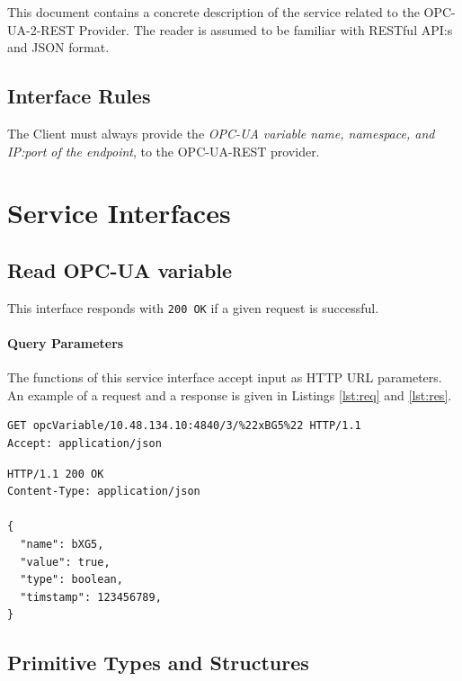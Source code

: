 \documentclass[a4paper]{arrowhead}
\begin{document}
This document contains a concrete description of the service related to the OPC-UA-2-REST Provider.
The reader is assumed to be familiar with RESTful API:s and JSON format. 

\vspace*{\baselineskip}

\subsection{Interface Rules}
The Client must always provide the \textit{OPC-UA variable name, namespace, and IP:port of the endpoint}, to the OPC-UA-REST provider.


\section{Service Interfaces}
\subsection{Read OPC-UA variable}
\label{sec:interfaces:BrokeringStore}

This interface responds with \texttt{200 OK} if a given request is successful.

\paragraph{Query Parameters}
The functions of this service interface accept input as HTTP URL parameters. An example of a request and a response is given in Listings \ref{lst:req} and \ref{lst:res}.

\begin{lstlisting}[language=http,caption={A request example. A possible response is given in Listing \ref{lst:res}.},label={lst:req}]
GET opcVariable/10.48.134.10:4840/3/%22xBG5%22 HTTP/1.1
Accept: application/json
\end{lstlisting}

\begin{lstlisting}[language=http,caption={A request-response example.},label={lst:res}]
HTTP/1.1 200 OK
Content-Type: application/json

{
  "name": bXG5,
  "value": true,
  "type": boolean,
  "timstamp": 123456789,
}
\end{lstlisting}

\newpage

\newpage

\subsection{Primitive Types and Structures}
\label{sec:model:primitive}
\end{document}
